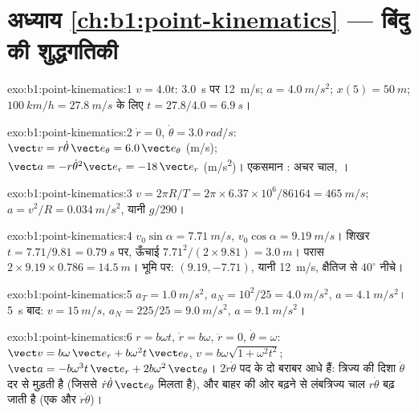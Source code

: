 \section*{अध्याय \ref{ch:b1:point-kinematics} --- बिंदु की शुद्धगतिकी}

\begin{solution}{exo:b1:point-kinematics:1}
$v = 4.0t$: \qty{3.0}{s} पर \qty{12}{m/s}; $a = \qty{4.0}{m/s^2}$;
$x(5) = \qty{50}{m}$; $\qty{100}{km/h} = \qty{27.8}{m/s}$ के लिए $t = 27.8/4.0
= \qty{6.9}{s}$।
\end{solution}

\begin{solution}{exo:b1:point-kinematics:2}
$\dot r = 0$, $\dot\theta = \qty{3.0}{rad/s}$: $\vect v = r\dot\theta\,\vect e_\theta
= 6.0\,\vect e_\theta$ (\unit{m/s}); $\vect a = -r\dot\theta^2\vect e_r =
-18\,\vect e_r$ (\unit{m/s^2})। एकसमान : अचर चाल, ।
\end{solution}

\begin{solution}{exo:b1:point-kinematics:3}
$v = 2\pi R/T = 2\pi \times 6.37\times10^6/86164 = \qty{465}{m/s}$;
$a = v^2/R = \qty{0.034}{m/s^2}$, यानी $g/290$।
\end{solution}

\begin{solution}{exo:b1:point-kinematics:4}
$v_0\sin\alpha = \qty{7.71}{m/s}$, $v_0\cos\alpha = \qty{9.19}{m/s}$।
शिखर $t = 7.71/9.81 = \qty{0.79}{s}$ पर, ऊँचाई $7.71^2/(2 \times 9.81) =
\qty{3.0}{m}$। परास $2 \times 9.19 \times 0.786 = \qty{14.5}{m}$।
भूमि पर: $(9.19, -7.71)$, यानी \qty{12}{m/s}, क्षैतिज से $40^\circ$
नीचे।
\end{solution}

\begin{solution}{exo:b1:point-kinematics:5}
$a_T = \qty{1.0}{m/s^2}$, $a_N = 10^2/25 = \qty{4.0}{m/s^2}$, $a =
\qty{4.1}{m/s^2}$। \qty{5}{s} बाद: $v = \qty{15}{m/s}$, $a_N = 225/25 =
\qty{9.0}{m/s^2}$, $a = \qty{9.1}{m/s^2}$।
\end{solution}

\begin{solution}{exo:b1:point-kinematics:6}
$r = b\omega t$, $\dot r = b\omega$, $\ddot r = 0$, $\dot\theta = \omega$:
$\vect v = b\omega\,\vect e_r + b\omega^2 t\,\vect e_\theta$, $v = b\omega
\sqrt{1 + \omega^2t^2}$; $\vect a = -b\omega^3 t\,\vect e_r + 2b\omega^2\,
\vect e_\theta$। $2\dot r\dot\theta$ पद के दो बराबर आधे हैं: त्रिज्य  की
दिशा $\dot\theta$ दर से मुड़ती है (जिससे
$\dot r\dot\theta\,\vect e_\theta$ मिलता है), और बाहर की ओर बढ़ने से
लंबत्रिज्य चाल $r\dot\theta$ बढ़ जाती है (एक और $\dot r\dot\theta$)।
\end{solution}

